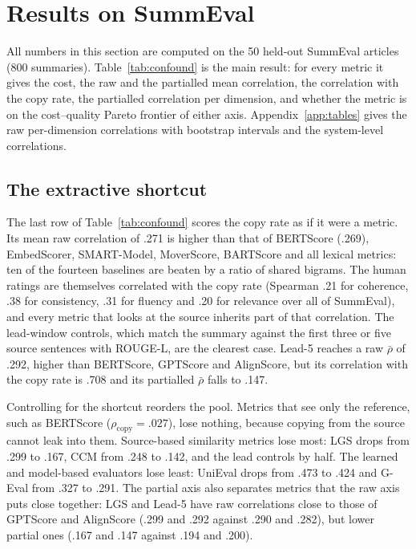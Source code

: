 \section{Results on SummEval}
\label{sec:summeval}

All numbers in this section are computed on the 50 held-out SummEval articles (800 summaries). Table~\ref{tab:confound} is the main result: for every metric it gives the cost, the raw and the partialled mean correlation, the correlation with the copy rate, the partialled correlation per dimension, and whether the metric is on the cost--quality Pareto frontier of either axis. Appendix~\ref{app:tables} gives the raw per-dimension correlations with bootstrap intervals and the system-level correlations.

\subsection{The extractive shortcut}

The last row of Table~\ref{tab:confound} scores the copy rate as if it were a metric. Its mean raw correlation of .271 is higher than that of BERTScore (.269), EmbedScorer, SMART-Model, MoverScore, BARTScore and all lexical metrics: ten of the fourteen baselines are beaten by a ratio of shared bigrams. The human ratings are themselves correlated with the copy rate (Spearman .21 for coherence, .38 for consistency, .31 for fluency and .20 for relevance over all of SummEval), and every metric that looks at the source inherits part of that correlation. The lead-window controls, which match the summary against the first three or five source sentences with ROUGE-L, are the clearest case. Lead-5 reaches a raw $\bar\rho$ of .292, higher than BERTScore, GPTScore and AlignScore, but its correlation with the copy rate is .708 and its partialled $\bar\rho$ falls to .147.

Controlling for the shortcut reorders the pool. Metrics that see only the reference, such as BERTScore ($\rho_{\mathrm{copy}}=.027$), lose nothing, because copying from the source cannot leak into them. Source-based similarity metrics lose most: LGS drops from .299 to .167, CCM from .248 to .142, and the lead controls by half. The learned and model-based evaluators lose least: UniEval drops from .473 to .424 and G-Eval from .327 to .291. The partial axis also separates metrics that the raw axis puts close together: LGS and Lead-5 have raw correlations close to those of GPTScore and AlignScore (.299 and .292 against .290 and .282), but lower partial ones (.167 and .147 against .194 and .200).

